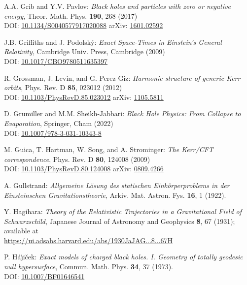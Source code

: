 \begin{thebibliography}{123}
A.A. Grib and Y.V. Pavlov:
{\em Black holes and particles with zero or negative energy},
Theor. Math. Phys. {\bf 190}, 268 (2017)\\
DOI: \href{https://doi.org/10.1134/S0040577917020088}{10.1134/S0040577917020088}\hfill
arXiv: \href{https://arxiv.org/abs/1601.02592}{1601.02592}

J.B. Griffiths and J. Podolský:
{\em Exact Space-Times in Einstein's General Relativity},
Cambridge Univ. Press, Cambridge (2009)\\
DOI: \href{https://doi.org/10.1017/CBO9780511635397}{10.1017/CBO9780511635397}

R. Grossman, J. Levin, and G. Perez-Giz:
{\em Harmonic structure of generic Kerr orbits},
Phys. Rev. D {\bf 85}, 023012 (2012)\\
DOI: \href{https://doi.org/10.1103/PhysRevD.85.023012}{10.1103/PhysRevD.85.023012}\hfill
arXiv: \href{https://arxiv.org/abs/1105.5811}{1105.5811}

D. Grumiller and M.M. Sheikh-Jabbari:
{\em Black Hole Physics: From Collapse to Evaporation},
Springer, Cham (2022)\\
DOI: \href{https://doi.org/10.1007/978-3-031-10343-8}{10.1007/978-3-031-10343-8}

M. Guica, T. Hartman, W. Song, and A. Strominger:
{\em The Kerr/CFT correspondence},
Phys. Rev. D {\bf 80}, 124008 (2009)\\
DOI: \href{https://doi.org/10.1103/PhysRevD.80.124008}{10.1103/PhysRevD.80.124008}\hfill
arXiv: \href{https://arxiv.org/abs/0809.4266}{0809.4266}

A. Gullstrand:
\emph{Allgemeine Lösung des statischen Einkörperproblems in der Einsteinschen Gravitationstheorie},
Arkiv. Mat. Astron. Fys. {\bf 16}, 1 (1922).

Y. Hagihara:
\emph{Theory of the Relativistic Trajectories in a Gravitational Field of Schwarzschild},
Japanese Journal of Astronomy and Geophysics {\bf 8}, 67 (1931);
available at \\
\url{https://ui.adsabs.harvard.edu/abs/1930JaJAG...8...67H}

P. H\'a\'\j i\v{c}ek: {\em Exact models of charged black holes. I. Geometry
of totally geodesic null hypersurface},
Commun. Math. Phys. {\bf 34}, 37 (1973). \\
DOI: \href{https://doi.org/10.1007/BF01646541}{10.1007/BF01646541}


\end{thebibliography}
